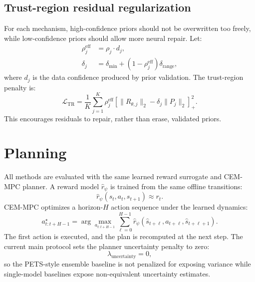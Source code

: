 \documentclass[11pt]{article}
\begin{document}
\subsection{Trust-region residual regularization}

For each mechanism, high-confidence priors should not be overwritten too freely, while low-confidence priors should allow more neural repair. Let:
\begin{align}
    \rho_j^{\mathrm{eff}}
    &=
    \rho_j \cdot d_j, \\
    \delta_j
    &=
    \delta_{\min} + (1-\rho_j^{\mathrm{eff}})\delta_{\mathrm{range}},
\end{align}
where $d_j$ is the data confidence produced by prior validation. The trust-region penalty is:
\begin{equation}
    \mathcal{L}_{\mathrm{TR}}
    =
    \frac{1}{K}
    \sum_{j=1}^{K}
    \rho_j^{\mathrm{eff}}
    \left[
        \|R_{\theta,j}\|_2
        -
        \delta_j\|P_j\|_2
    \right]_+^2.
\end{equation}
This encourages residuals to repair, rather than erase, validated priors.

\section{Planning}

All methods are evaluated with the same learned reward surrogate and CEM-MPC planner. A reward model $\hat r_\psi$ is trained from the same offline transitions:
\begin{equation}
    \hat r_\psi(s_t,a_t,s_{t+1})
    \approx
    r_t.
\end{equation}
CEM-MPC optimizes a horizon-$H$ action sequence under the learned dynamics:
\begin{equation}
    a_{t:t+H-1}^{\star}
    =
    \arg\max_{a_{t:t+H-1}}
    \sum_{\ell=0}^{H-1}
    \hat r_\psi
    \left(
        \hat s_{t+\ell},
        a_{t+\ell},
        \hat s_{t+\ell+1}
    \right).
\end{equation}
The first action is executed, and the plan is recomputed at the next step. The current main protocol sets the planner uncertainty penalty to zero:
\begin{equation}
    \lambda_{\mathrm{uncertainty}}=0,
\end{equation}
so the PETS-style ensemble baseline is not penalized for exposing variance while single-model baselines expose non-equivalent uncertainty estimates.
\end{document}

